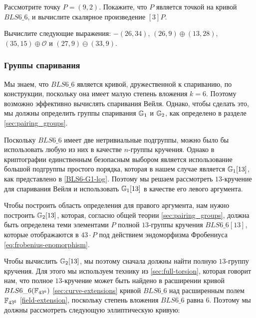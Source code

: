 \endgroup
\begin{exercise}
\label{ex:BLS66-scalar-product}
Рассмотрите точку $P=(9,2)$. Покажите, что $P$ является точкой на кривой $BLS6\_6$, и вычислите скалярное произведение $[3]P$.
\end{exercise}
\begin{exercise}
Вычислите следующие выражения: $-(26,34)$, $(26,9)\oplus(13,28)$, $(35,15)\oplus \mathcal{O}$ и $(27,9)\ominus(33,9)$.
\end{exercise}
\subsubsection{Группы спаривания}
\label{sec:bls66-pairing-groups}
Мы знаем, что $BLS6\_6$ является кривой, дружественной к спариванию, по конструкции, поскольку она имеет малую степень вложения $k=6$. Поэтому возможно эффективно вычислять спаривания Вейля. Однако, чтобы сделать это, мы должны определить группы спаривания $\mathbb{G}_1$ и $\mathbb{G}_2$, как определено в разделе \ref{sec:pairing_groups}. 

Поскольку $BLS6\_6$ имеет две нетривиальные подгруппы, можно было бы использовать любую из них в качестве $n$-группы кручения. Однако в криптографии единственным безопасным выбором является использование большой подгруппы простого порядка, которая в нашем случае является $\mathbb{G}_1[13]$, как представлено в \ref{BLS6-G1-log}. Поэтому мы решаем рассмотреть $13$-кручение для спаривания Вейля и использовать $\mathbb{G}_1[13]$ в качестве его левого аргумента.

Чтобы построить область определения для правого аргумента, нам нужно построить $\mathbb{G}_2[13]$, которая, согласно общей теории \ref{sec:pairing_groups}, должна быть определена теми элементами $P$ полной $13$-группы кручения $BLS6\_6[13]$, которые отображаются в $43\cdot P$ под действием эндоморфизма Фробениуса \ref{eq:frobenius-enomorphism}. 

Чтобы вычислить $\mathbb{G}_2[13]$, мы поэтому сначала должны найти полную $13$-группу кручения. Для этого мы используем технику из \ref{sec:full-torsion}, которая говорит нам, что полное $13$-кручение может быть найдено в расширении кривой $BLS6\_6(\mathbb{F}_{43^6})$ \ref{sec:curve-extensions} кривой $BLS6\_6$ над расширенным полем $\mathbb{F}_{43^6}$ \ref{field-extension}, поскольку степень вложения $BLS6\_6$ равна $6$. Поэтому мы должны рассмотреть следующую эллиптическую кривую:

